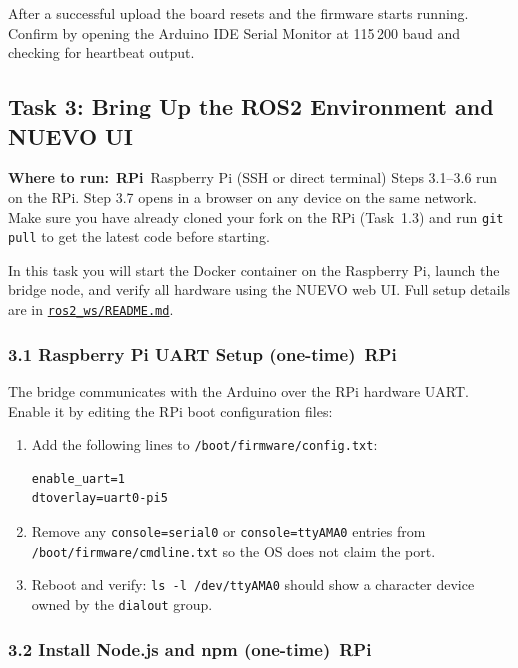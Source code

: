 \documentclass{ol-softwaremanual}
\newcommand{\onrpi}{%
  \,\colorbox{blue!20}{\footnotesize\sffamily\bfseries RPi}}
\newcommand{\machinebox}[2]{%
  \par\noindent
  \colorbox{gray!12}{\parbox{\dimexpr\linewidth-2\fboxsep}{%
    \small\sffamily\textbf{Where to run:} #1 \quad\textbar\quad #2}}%
  \par\smallskip}
\newcommand{\doclink}[2]{\href{#1}{#2}}
\begin{document}
After a successful upload the board resets and the firmware starts running.
Confirm by opening the Arduino IDE Serial Monitor at 115\,200 baud and checking
for heartbeat output.


\subsection{Task 3: Bring Up the ROS2 Environment and NUEVO UI}

\machinebox{\onrpi\ Raspberry Pi (SSH or direct terminal)}{Steps 3.1–3.6 run on the RPi. Step 3.7 opens in a browser on any device on the same network. Make sure you have already cloned your fork on the RPi (Task~1.3) and run \texttt{git pull} to get the latest code before starting.}

In this task you will start the Docker container on the Raspberry Pi, launch the
bridge node, and verify all hardware using the NUEVO web UI.
Full setup details are in
\doclink{https://github.com/pochihh/Project-NUEVO/blob/main/ros2_ws/README.md}{\texttt{ros2\_ws/README.md}}.

\subsubsection*{3.1 Raspberry Pi UART Setup (one-time)\onrpi}

The bridge communicates with the Arduino over the RPi hardware UART.
Enable it by editing the RPi boot configuration files:

\begin{enumerate}
  \item Add the following lines to \texttt{/boot/firmware/config.txt}:
\begin{verbatim}
enable_uart=1
dtoverlay=uart0-pi5
\end{verbatim}

  \item Remove any \texttt{console=serial0} or \texttt{console=ttyAMA0} entries
        from \texttt{/boot/firmware/cmdline.txt} so the OS does not claim the port.

  \item Reboot and verify: \texttt{ls -l /dev/ttyAMA0} should show a character
        device owned by the \texttt{dialout} group.
\end{enumerate}

\subsubsection*{3.2 Install Node.js and npm (one-time)\onrpi}
\end{document}
